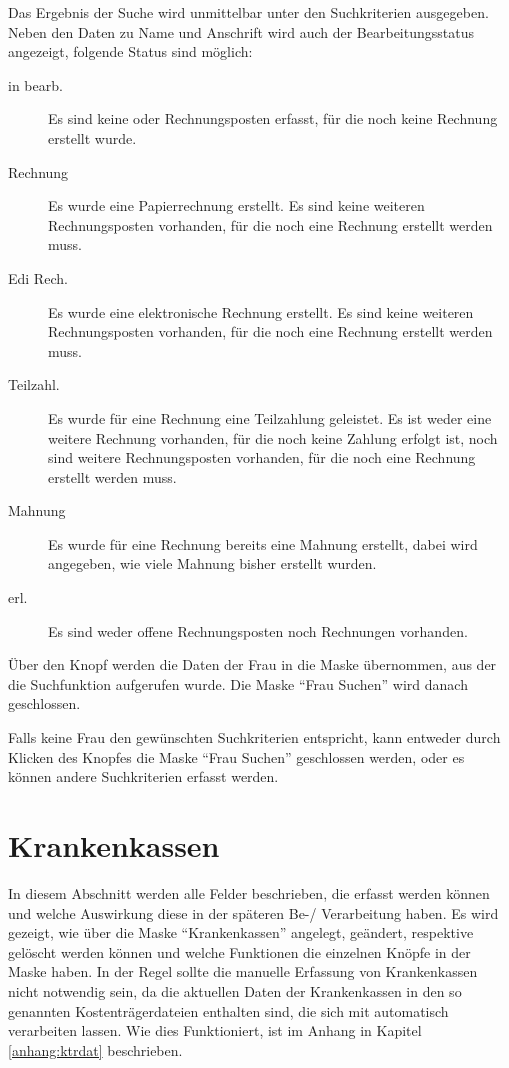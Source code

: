 Das Ergebnis der Suche wird unmittelbar unter den Suchkriterien ausgegeben.
Neben den Daten zu Name und Anschrift wird auch der Bearbeitungsstatus
angezeigt, folgende Status sind möglich:
\begin{description}
\item[in bearb.] 
Es sind keine oder Rechnungsposten erfasst, für die noch
keine Rechnung erstellt wurde.
\item[Rechnung] 
Es wurde eine Papierrechnung erstellt. Es sind keine weiteren
Rechnungsposten vorhanden, für die noch eine Rechnung erstellt werden muss.
\item[Edi Rech.] 
Es wurde eine elektronische Rechnung erstellt. Es sind
keine weiteren Rechnungsposten vorhanden, für die noch eine Rechnung
erstellt werden muss.
\item[Teilzahl.] 
Es wurde für eine Rechnung eine Teilzahlung geleistet. Es
ist weder eine weitere Rechnung vorhanden, für die noch keine Zahlung erfolgt
ist, noch sind weitere Rechnungsposten vorhanden, für die noch eine Rechnung erstellt werden muss.
\item[Mahnung] 
Es wurde für eine Rechnung bereits eine Mahnung erstellt, 
dabei wird angegeben, wie viele Mahnung bisher erstellt wurden.
\item[erl.] 
Es sind weder offene Rechnungsposten noch Rechnungen vorhanden.
\end{description}

Über den Knopf  werden die Daten der Frau in die Maske
übernommen, aus der die Suchfunktion aufgerufen wurde. Die Maske ``Frau Suchen''
wird danach geschlossen.

Falls keine Frau den gewünschten Suchkriterien entspricht, kann entweder
durch Klicken des Knopfes  die Maske ``Frau Suchen''
geschlossen werden, oder es können andere Suchkriterien erfasst werden.





\section{Krankenkassen\label{krankenkassenerfassung:kap}}
In diesem Abschnitt werden alle Felder beschrieben, die erfasst werden
können und welche Auswirkung diese in der späteren Be-/ Verarbeitung haben.
Es wird gezeigt, wie über die Maske ``Krankenkassen'' angelegt, geändert,
respektive gelöscht werden können und
welche Funktionen die einzelnen Knöpfe in der Maske haben. In der Regel
sollte die manuelle Erfassung von Krankenkassen nicht notwendig sein,
da die aktuellen Daten der Krankenkassen in den so genannten 
Kostenträgerdateien enthalten sind, die sich mit \tinyHeb\/ automatisch
verarbeiten lassen. Wie dies Funktioniert, ist im Anhang in Kapitel
\vref{anhang:ktrdat} beschrieben.

